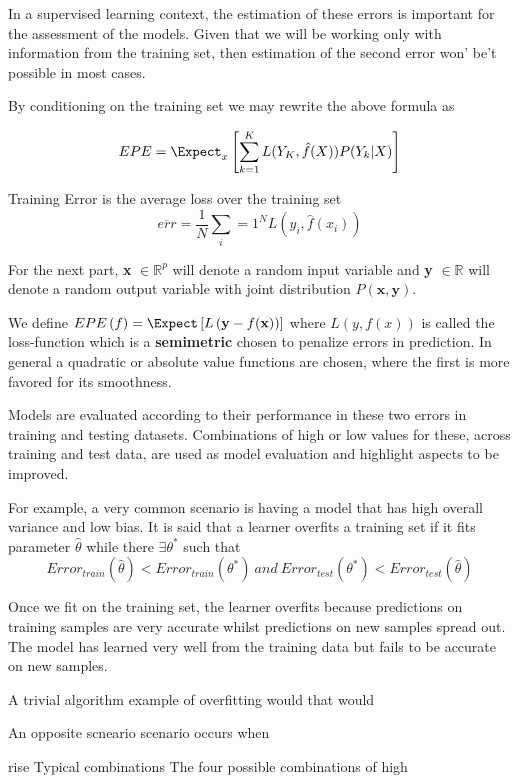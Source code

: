 In a supervised learning context, the estimation of these errors is important for the assessment of the models.  Given that we will be working only with information from the training set, then estimation of the second error won' be't possible in most cases.

By conditioning on the training set we may rewrite the above formula as 

\begin{equation}\label{classificationEPE}
	 EPE = \Expect_x\left[ \sum_{k=1}^{K} L( Y_K , \hat{f}(X) ) P(Y_k|X) \right]
\end{equation}


\begin{definition}{Training Error}
	is the average loss over the training set
	$$ \overline{err} = \frac{1}{N} \sum_i=1^N L(y_i, \hat{f}(x_i) )$$
\end{definition}


For the next part, \textbf{x} $\in \mathbb{R}^{p}$ will denote a random input variable and \textbf{y}  $\in \mathbb{R}$ will denote a random output variable with joint distribution $P\left(\textbf{x},\textbf{y}\right)$.

We define $EPE\left(f \right) = \Expect\left[L\left(\textbf{y} - f(\textbf{x}) \right) \right] $ where $L(y,f\left(x\right))$ is called the loss-function which is a \textbf{semimetric} chosen to penalize errors in prediction. In general a quadratic or absolute value functions are chosen, where the first is more favored for its smoothness. 


Models are evaluated according to their performance in these two errors in training and testing datasets. Combinations of high or low values for these, across training and test data, are used as model evaluation and highlight aspects to be improved. 

For example, a very common scenario is having a model that has high overall variance and low bias. 
It is said that a learner overfits a training set  if it fits parameter $\hat{\theta}$ while there $\exists \theta^*$ such that
\begin{equation} \label{eq:overfitting}
Error_{train}(\hat{\theta}) < Error_{train}(\theta^*) \  and \ Error_{test}(\theta^*) < Error_{test}(\hat{\theta})   
\end{equation}

Once we fit on the training set, the learner overfits because predictions on training samples are very accurate whilst predictions on new samples spread out. The model has learned very well from the training data but fails to be accurate on new samples.

A trivial algorithm example of overfitting would  that would 

An opposite scneario scenario occurs when


rise Typical combinations
The four possible combinations of high 

